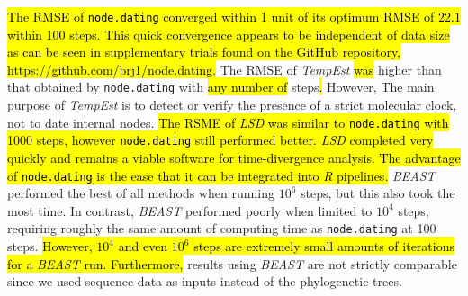 \documentclass{bioinfo}
\newcommand{\code}[1]{{\tt #1}}
\newcommand{\edit}[1]{\hl{#1}}
\begin{document}
\edit{The RMSE of {\tt node.dating} converged within 1 unit of its optimum RMSE of $22.1$ within 100 steps.
This quick convergence appears to be independent of data size as can be seen in supplementary trials found on the GitHub repository, https://github.com/brj1/node.dating.}
The\edit{ }RMSE\edit{} of \emph{TempEst} \edit{was} higher than that obtained by \code{node.dating} with \edit{any number of} steps\edit{.}
However, The main purpose of \emph{TempEst} is to detect or verify the presence of a strict molecular clock, not to date internal nodes.
\edit{The RSME of \emph{LSD} was similar to {\tt node.dating} with 1000 steps, however {\tt node.dating} still performed better.
\emph{LSD} completed very quickly and remains a viable software for time-divergence analysis.
The advantage of {\tt node.dating} is the ease that it can be integrated into \emph{R} pipelines.}
\emph{BEAST} performed the best of all methods when running $10^6$ steps, but this also took the most time.
In contrast, \emph{BEAST} performed poorly when limited to $10^4$ steps, requiring roughly the same amount of computing time as \code{node.dating} at 100 steps.
\edit{However, $10^4$ and even $10^6$ steps are extremely small amounts of iterations for a \emph{BEAST} run. Furthermore,} results using \emph{BEAST} are not strictly comparable since we used sequence data as inputs instead of the phylogenetic trees.
\end{document}
